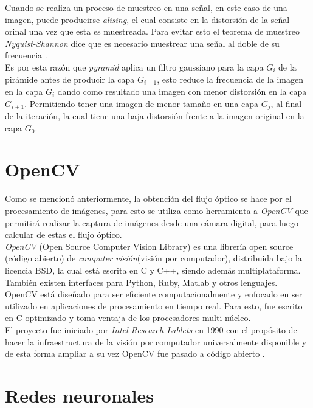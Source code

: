 \documentclass{iccmemoria}
\begin{document}
Cuando se realiza un proceso de muestreo en una señal, en este caso de una imagen, puede producirse \emph{alising}, el cual consiste en la distorsión de la señal orinal una vez que esta es muestreada. Para evitar esto el teorema de muestreo \emph{Nyquist-Shannon} dice que es necesario muestrear una señal al doble de su frecuencia \cite{ImagePyramid}.\\

Es por esta razón que \emph{pyramid} aplica un filtro gaussiano para la capa $G_i$ de la pirámide antes de producir la capa $G_{i+1}$, esto reduce la frecuencia de la imagen en la capa $G_i$ dando como resultado una imagen con menor distorsión en la capa $G_{i+1}$. Permitiendo tener una imagen de menor tamaño en una capa $G_j$, al final de la iteración, la cual tiene una baja distorsión frente a la imagen original en la capa $G_0$.\\

\section{OpenCV}

Como se mencionó anteriormente, la obtención del flujo óptico se hace por el procesamiento de imágenes, para esto se utiliza como herramienta a \emph{OpenCV} que permitirá realizar la captura de imágenes desde una cámara digital, para luego calcular de estas el flujo óptico.\\

\emph{OpenCV} (Open Source Computer Vision Library) es una librería open source (código abierto) de \emph{computer visión}(visión por computador), distribuida bajo la licencia BSD, la cual está escrita en C y C++, siendo además multiplataforma. También existen interfaces para Python, Ruby, Matlab y otros lenguajes.\\

OpenCV está diseñado para ser eficiente computacionalmente y enfocado en ser utilizado en aplicaciones de procesamiento en tiempo real. Para esto, fue escrito en C optimizado y toma ventaja de los procesadores multi núcleo.\\

El proyecto fue iniciado por \emph{Intel Research Lablets} en 1990 con el propósito de hacer la infraestructura de la visión por computador universalmente disponible y de esta forma ampliar a su vez OpenCV fue pasado a código abierto \cite{bradski2008learning}.\\

\section{Redes neuronales}\label{redes_neuronales}
\end{document}
